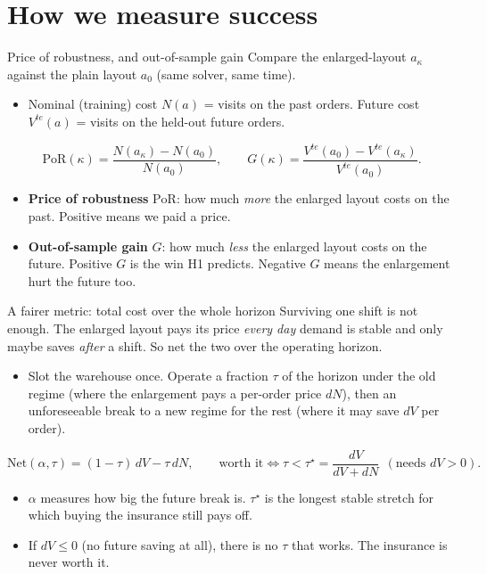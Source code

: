 \documentclass[11pt,aspectratio=169]{beamer}
\newcommand{\gt}[1]{\textcolor{good}{#1}}
\newcommand{\term}[1]{\textcolor{blue!60!black}{\textbf{#1}}}
\begin{document}
\section{How we measure success}

\begin{frame}{Price of robustness, and out-of-sample gain}
  Compare the enlarged-layout $a_\kappa$ against the plain layout $a_0$ (same solver, same time).
  \begin{itemize}
    \item Nominal (training) cost $N(a)$ = visits on the past orders. Future cost $V^{te}(a)$ = visits on the held-out future orders.
  \end{itemize}
  \[
  \mathrm{PoR}(\kappa) = \frac{N(a_\kappa)-N(a_0)}{N(a_0)},
  \qquad
  G(\kappa) = \frac{V^{te}(a_0)-V^{te}(a_\kappa)}{V^{te}(a_0)}.
  \]
  \begin{itemize}
    \item \term{Price of robustness} $\mathrm{PoR}$: how much \emph{more} the enlarged layout costs on the past. Positive means we paid a price.
    \item \term{Out-of-sample gain} $G$: how much \emph{less} the enlarged layout costs on the future. \gt{Positive $G$ is the win H1 predicts.} Negative $G$ means the enlargement hurt the future too.
  \end{itemize}
\end{frame}

\begin{frame}{A fairer metric: total cost over the whole horizon}
  Surviving one shift is not enough. The enlarged layout pays its price \emph{every day} demand is stable and only maybe saves \emph{after} a shift. So net the two over the operating horizon.
  \begin{itemize}
    \item Slot the warehouse once. Operate a fraction $\tau$ of the horizon under the old regime (where the enlargement pays a per-order price $dN$), then an unforeseeable break to a new regime for the rest (where it may save $dV$ per order).
  \end{itemize}
  \[
  \mathrm{Net}(\alpha,\tau) = (1-\tau)\,dV - \tau\,dN,
  \qquad
  \text{worth it} \iff \tau < \tau^\star = \frac{dV}{dV+dN}\ \ (\text{needs } dV>0).
  \]
  \begin{itemize}
    \item $\alpha$ measures how big the future break is. $\tau^\star$ is the longest stable stretch for which buying the insurance still pays off.
    \item If $dV\le 0$ (no future saving at all), there is no $\tau$ that works. The insurance is never worth it.
  \end{itemize}
\end{frame}
\end{document}
